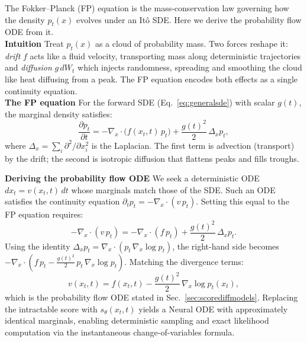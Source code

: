 The Fokker--Planck (FP) equation is the mass-conservation law governing how the
density $p_t(x)$ evolves under an It\^{o} SDE. Here we derive the probability
flow ODE from it.\\

\textbf{Intuition} \quad Treat $p_t(x)$ as a cloud of probability mass. Two forces
reshape it: \textit{drift} $f$ acts like a fluid velocity, transporting mass
along deterministic trajectories and \textit{diffusion} $g\,dW_t$ which injects
randomness, spreading and smoothing the cloud like heat diffusing from a peak.
The FP equation encodes both effects as a single continuity equation.\\

\textbf{The FP equation} \quad For the forward SDE (Eq.\ \ref{eq:generalsde}) with
scalar $g(t)$, the marginal density satisfies:
\begin{equation}
    \label{eq:fokker_planck}
    \frac{\partial p_t}{\partial t}
    = -\nabla_x \cdot \bigl(f(x_t,t)\,p_t\bigr)
    + \frac{g(t)^2}{2}\,\Delta_x p_t,
\end{equation}
where $\Delta_x = \sum_i \partial^2/\partial x_i^2$ is the Laplacian. The first
term is advection (transport) by the drift; the second is isotropic diffusion that flattens
peaks and fills troughs.

\textbf{Deriving the probability flow ODE} \quad We seek a deterministic ODE
$dx_t = v(x_t,t)\,dt$ whose marginals match those of the SDE. Such an ODE
satisfies the continuity equation $\partial_t p_t = -\nabla_x\cdot(v\,p_t)$.
Setting this equal to the FP equation requires:
\[
    -\nabla_x\cdot(v\,p_t)
    = -\nabla_x\cdot(f\,p_t) + \frac{g(t)^2}{2}\,\Delta_x p_t.
\]
Using the identity $\Delta_x p_t = \nabla_x\cdot(p_t\,\nabla_x\log p_t)$,
the right-hand side becomes $-\nabla_x\cdot\!\left(f\,p_t -
\frac{g(t)^2}{2}\,p_t\,\nabla_x\log p_t\right)$. Matching the divergence terms:
\begin{equation}
    \label{eq:pf_ode_derived}
    v(x_t,t) = f(x_t,t) - \frac{g(t)^2}{2}\,\nabla_x\log p_t(x_t),
\end{equation}
which is the probability flow ODE stated in Sec.\ \ref{sec:scorediffmodels}.
Replacing the intractable score with $s_\theta(x_t,t)$ yields a Neural ODE
with approximately identical marginals, enabling deterministic sampling and
exact likelihood computation via the instantaneous change-of-variables formula.


